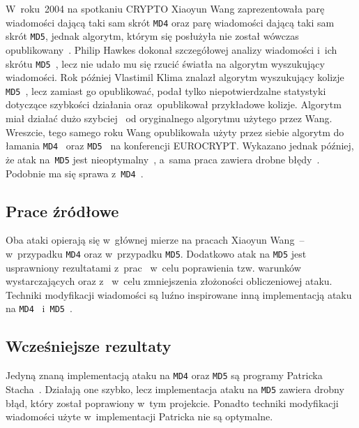 \documentclass[12pt,a4paper,twoside]{article}
\begin{document}
W~roku~2004 na spotkaniu CRYPTO Xiaoyun Wang zaprezentowała parę wiadomości
dającą taki sam skrót \texttt{MD4} oraz parę wiadomości dającą taki sam skrót
\texttt{MD5}, jednak algorytm, którym się posłużyła nie został wówczas
opublikowany~\cite{wang2004finding}. Philip Hawkes dokonał szczegółowej analizy
wiadomości i~ich skrótu \texttt{MD5}~\cite{hawkes2004musings}, lecz nie udało
mu się rzucić światła na algorytm wyszukujący wiadomości. Rok później Vlastimil
Klima znalazł algorytm wyszukujący kolizje
\texttt{MD5}~\cite{klima2005finding1}, lecz zamiast go opublikować, podał tylko
niepotwierdzalne statystyki dotyczące szybkości działania oraz~opublikował
przykładowe kolizje. Algorytm miał działać dużo
szybciej~\cite{klima2006tunnels} od oryginalnego algorytmu użytego przez Wang.
Wreszcie, tego samego roku Wang opublikowała użyty przez siebie algorytm do
łamania \texttt{MD4}~\cite{wang2005md4} oraz \texttt{MD5}~\cite{wang2005md5} na
konferencji EUROCRYPT. Wykazano jednak później, że atak na~\texttt{MD5} jest
nieoptymalny~\cite{klima2005finding2,klima2006tunnels}, a~sama praca zawiera
drobne błędy~\cite{yajima2005wang,sasaki2005improved,liang2007improved}.
Podobnie ma się sprawa z~\texttt{MD4}~\cite{naito2005improved}.

\subsection{Prace źródłowe}

Oba ataki opierają się w~głównej mierze na pracach Xiaoyun Wang~--
\cite{wang2005md4} w~przypadku \texttt{MD4} oraz \cite{wang2005md5} w~przypadku
\texttt{MD5}. Dodatkowo atak na \texttt{MD5} jest usprawniony rezultatami
z~prac~\cite{yajima2005wang,sasaki2005improved,liang2007improved} w~celu
poprawienia tzw. warunków wystarczających oraz z~\cite{klima2005finding2} w~celu
zmniejszenia złożoności obliczeniowej ataku. Techniki modyfikacji wiadomości są
luźno inspirowane inną implementacją ataku na \texttt{MD4}~\cite{stach2005md4}
i~\texttt{MD5}~\cite{stach2005md5}.

\subsection{Wcześniejsze rezultaty}

Jedyną znaną implementacją ataku na \texttt{MD4} oraz \texttt{MD5} są programy
Patricka Stacha~\cite{stach2005md4,stach2005md5}. Działają one szybko, lecz
implementacja ataku na \texttt{MD5} zawiera drobny błąd, który został
poprawiony w~tym projekcie. Ponadto techniki modyfikacji wiadomości użyte
w~implementacji Patricka nie są optymalne.
\end{document}
